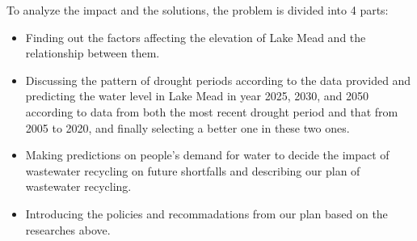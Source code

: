 \documentclass[12pt]{article}
\theoremstyle{definition}
\theoremstyle{remark}
\numberwithin{equation}{section}
\begin{document}
		To analyze the impact and the solutions, the problem is divided into 4 parts:
		\begin{itemize}
			
			\item Finding out the factors affecting the elevation of Lake Mead and the relationship between them.
			\item Discussing the pattern of drought periods according to the data provided and predicting the water level in Lake Mead in year 2025,
			2030, and 2050 according to data from both the most recent drought period and that from 2005 to 2020, and finally selecting a 
			better one in these two ones.
			\item Making predictions on people's demand for water to decide the impact of wastewater recycling on future shortfalls and describing 
			our plan of wastewater recycling.
			\item Introducing the policies and recommadations from our plan based on the researches above.
		\end{itemize}
\end{document}
